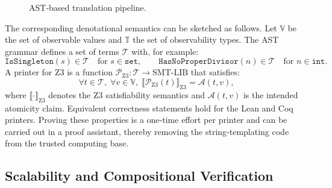 \begin{figure}[htbp]
\centering
{}
\caption{AST‑based translation pipeline.}
\label{fig:ast_model}
\end{figure}

The corresponding denotational semantics can be sketched as follows.
Let $\mathbb{V}$ be the set of observable values and $\mathbb{T}$ the
set of observability types.  The AST grammar defines a set of terms
$\mathcal{T}$ with, for example:
\[
\texttt{IsSingleton}(s) \in \mathcal{T} \quad \text{for } s \in \texttt{set},
\qquad
\texttt{HasNoProperDivisor}(n) \in \mathcal{T} \quad \text{for } n \in \texttt{int}.
\]
A printer for Z3 is a function
$\mathcal{P}_{\mathrm{Z3}} : \mathcal{T} \to \mathrm{SMT‑LIB}$
that satisfies:
\[
\forall t \in \mathcal{T}, \; \forall v \in \mathbb{V},\;
\llbracket \mathcal{P}_{\mathrm{Z3}}(t) \rrbracket_{\mathrm{Z3}} =
\mathcal{A}(t,v),
\]
where $\llbracket \cdot \rrbracket_{\mathrm{Z3}}$ denotes the Z3
satisfiability semantics and $\mathcal{A}(t,v)$ is the intended
atomicity claim.  Equivalent correctness statements hold for the
Lean and Coq printers.  Proving these properties is a one‑time effort
per printer and can be carried out in a proof assistant, thereby
removing the string‑templating code from the trusted computing base.

\subsection{Scalability and Compositional Verification}

